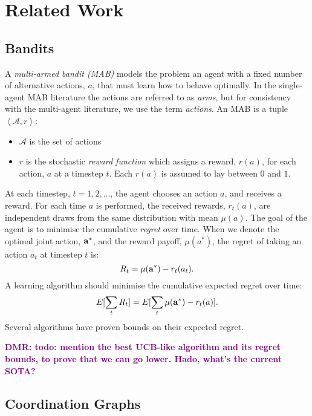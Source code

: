 \documentclass{article}
\newcommand{\dmr}[1]{\textcolor{purple}{\bf DMR: #1}}
\begin{document}
\section{Related Work}\label{sec:relwork}

\subsection{Bandits}
A \emph{multi-armed bandit (MAB)} \cite{auer2010ucb} models the problem an agent with a fixed number of alternative actions, $a$, that must learn how to behave optimally. In the single-agent MAB literature the actions are referred to as \emph{arms}, but for consistency with the multi-agent literature, we use the term \emph{actions}. An MAB is a tuple $\left<\mathcal{A}, r\right>$: 
\begin{itemize}
\item $\mathcal{A}$ is the set of actions
\item $r$ is the stochastic \emph{reward function} which assigns a reward, $r(a)$, for each action, $a$ at a timestep $t$. Each $r(a)$ is assumed to lay between $0$ and $1$.  
\end{itemize}
At each timestep, $t=1,2,...$, the agent chooses an action $a$, and receives a reward. For each time $a$ is performed, the received rewards, $r_t(a)$, are independent draws from the same distribution with mean $\mu(a)$. The goal of the agent is to minimise the cumulative \emph{regret} over time.
When we denote the optimal joint action, ${\bf a}^*$, and the reward payoff, $\mu({a}^*)$, the regret of taking an action $a_t$ at timestep $t$ is: 
\[
	R_t = \mu({\bf a}^*) - r_t(a_t).
\]
A learning algorithm should minimise the cumulative expected regret over time: 
\[
    E[\sum_t R_t] =  E[\sum_t \mu({\bf a}^*) - r_t(a)].
\]
Several algorithms have proven bounds on their expected {regret}.

\dmr{todo: mention the best UCB-like algorithm and its regret bounds, to prove that we can go lower. Hado, what's the current SOTA?}

\subsection{Coordination Graphs}
\end{document}
